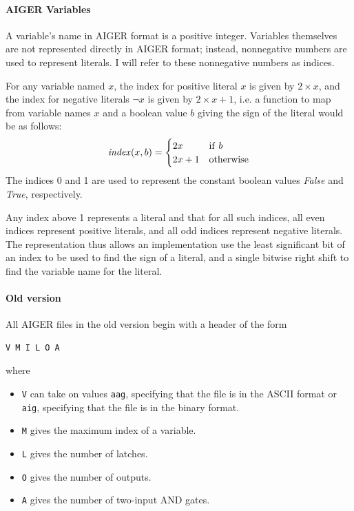 \documentclass[12pt,a4paper,twoside,openright]{report}
\begin{document}
\paragraph{AIGER Variables}{
A variable's name in AIGER format is a positive integer. Variables themselves
are not represented directly in AIGER format; instead, nonnegative numbers
are used to represent literals.
I will refer to these nonnegative numbers as indices.

For any variable named $x$, the index for positive literal $x$ is given by
$2 \times x$, and the index for negative literals $\neg x$ is given by
$2 \times x + 1$, i.e. a function to map from variable names $x$ and a boolean
value $b$ giving the sign of the literal would be as follows:
$${\it index}(x, b) =
\begin{cases}
2x & {\rm if}~b \\
2x + 1 & {\rm otherwise}
\end{cases}$$
The indices 0 and 1 are used to represent the constant boolean values {\it False}
and {\it True}, respectively.

Any index above 1 represents a literal and that for all such
indices, all even indices represent positive literals, and all odd indices
represent negative literals. The representation thus allows an implementation
use the least significant bit of an index to be used to find the sign of a literal,
and a single bitwise right shift to find the variable name for the literal.

\paragraph{Old version}{
All AIGER files in the old version begin with a header of the form
\begin{verbatim}
V M I L O A
\end{verbatim}
where
\begin{itemize}
\item \verb,V, can take on values \verb,aag,, specifying that the file is in the ASCII format or \verb,aig,,
specifying that the file is in the binary format.
\item \verb,M, gives the maximum index of a variable.
\item \verb,L, gives the number of latches.
\item \verb,O, gives the number of outputs.
\item \verb,A, gives the number of two-input AND gates.
\end{itemize}

}}
\end{document}

